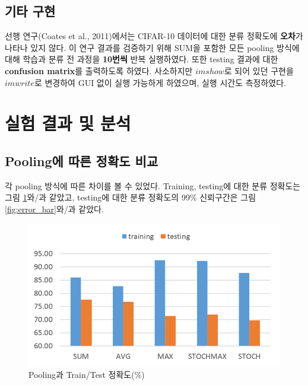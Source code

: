 \documentclass[a4paper,9pt]{article}
\begin{document}
\begin{multicols*}{2}
\subsection{기타 구현}

선행 연구(Coates et al., 2011)에서는 CIFAR-10 데이터에 대한 분류 정확도에 \textbf{오차}가 나타나 있지 않다.
이 연구 결과를 검증하기 위해 SUM을 포함한 모든 pooling 방식에 대해 학습과 분류 전 과정을 \textbf{10번씩} 반복 실행하였다.
또한 testing 결과에 대한 \textbf{confusion matrix}를 출력하도록 하였다.
사소하지만 $imshow$로 되어 있던 구현을 $imwrite$로 변경하여 GUI 없이 실행 가능하게 하였으며, 실행 시간도 측정하였다.

\section{실험 결과 및 분석}

\subsection{Pooling에 따른 정확도 비교}

각 pooling 방식에 따른 차이를 볼 수 있었다.
Training, testing에 대한 분류 정확도는 그림 \ref{fig:accuracy}와/과 같았고, testing에 대한 분류 정확도의 99\% 신뢰구간은 그림 \ref{fig:error_bar}와/과 같았다.

\begin{figure}[H]
\includegraphics[width=\linewidth]{accuracy}
\caption{Pooling과 Train/Test 정확도(\%)}
\label{fig:accuracy}
\end{figure}


\end{multicols*}
\end{document}

